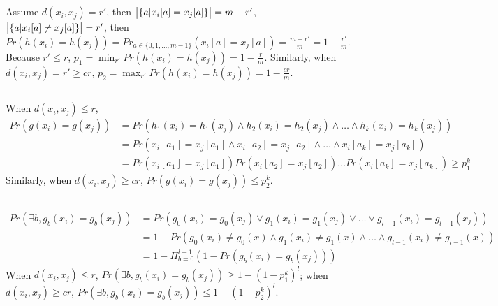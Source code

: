 \documentclass{article}
\begin{document}
        \subsection{}
        Assume $d(x_i, x_j)=r'$, then $\big{|}\{a|x_i[a]=x_j[a]\}\big{|}=m-r'$, $\big{|}\{a|x_i[a]\neq x_j[a]\}\big{|}=r'$, then $Pr(h(x_i)=h(x_j))=Pr_{a\in\{0,1,\dots,m-1\}}(x_i[a]=x_j[a])=\frac{m-r'}{m}=1-\frac{r'}{m}$.
        Because $r'\leq r$, $p_1=\min_{r'}Pr(h(x_i)=h(x_j))=1-\frac{r}{m}$.
        Similarly, when $d(x_i, x_j)=r'\geq cr$, $p_2=\max_{r'}Pr(h(x_i)=h(x_j))=1-\frac{cr}{m}$.

        \subsection{}
        When $d(x_i, x_j)\leq r$,
        \begin{align*}
            Pr(g(x_i)=g(x_j))&=Pr(h_1(x_i)=h_1(x_j)\wedge h_2(x_i)=h_2(x_j)\wedge\dots\wedge h_k(x_i)=h_k(x_j))\\
            &=Pr(x_i[a_1]=x_j[a_1]\wedge x_i[a_2]=x_j[a_2]\wedge\dots\wedge x_i[a_k]=x_j[a_k])\\
            &=Pr(x_i[a_1]=x_j[a_1])Pr(x_i[a_2]=x_j[a_2])\dots Pr(x_i[a_k]=x_j[a_k])\geq p_1^k
        \end{align*}
        Similarly, when $d(x_i, x_j)\geq cr$, $Pr(g(x_i)=g(x_j))\leq p_2^k$.

        \subsection{}\label{4.4}
        \begin{align*}
            Pr(\exists b, g_b(x_i)=g_b(x_j))&=Pr(g_0(x_i)=g_0(x_j)\lor g_1(x_i)=g_1(x_j)\lor\dots\lor g_{l-1}(x_i)=g_{l-1}(x_j))\\
            &=1-Pr(g_0(x_i)\neq g_0(x)\wedge g_1(x_i)\neq g_1(x)\wedge\dots\wedge g_{l-1}(x_i)\neq g_{l-1}(x))\\
            &=1-\Pi_{b=0}^{l-1}(1-Pr(g_b(x_i)=g_b(x_j)))
        \end{align*}
        When $d(x_i, x_j)\leq r$, $Pr(\exists b, g_b(x_i)=g_b(x_j))\geq 1-(1-p_1^k)^l$; when $d(x_i, x_j)\geq cr$,
        $Pr(\exists b, g_b(x_i)=g_b(x_j))\leq 1-(1-p_2^k)^l$.
\end{document}
